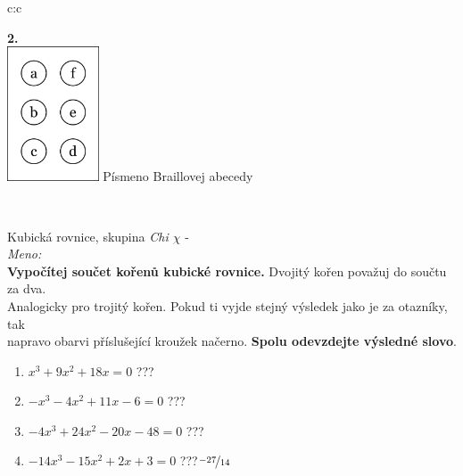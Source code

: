 \documentclass[10pt]{report}
\begin{document}
\begin{tabular}{c:c}
\begin{minipage}[c][99mm][t]{0.49\linewidth}
\begin{center}
\begin{minipage}{0.77\linewidth}
\begin{center}
\begin{varwidth}{\textwidth}
\end{varwidth}
\end{center}
\end{minipage}
\begin{minipage}{0.20\linewidth}
\begin{center}
{\Huge\bfseries 2.} \\[2mm]
\includegraphics[height=40mm]{../images/braille.png}
{\small Písmeno Braillovej abecedy}
\end{center}
\end{minipage}
\end{center}
\end{minipage}
\\ \hdashline
\begin{minipage}[c][99mm][t]{0.49\linewidth}
\begin{center}
\vspace{7mm}
{\huge Kubická rovnice, skupina \textit{Chi $\chi$} -}\\[4.5mm]
\textit{Meno:}\phantom{xxxxxxxxxxxxxxxxxxxxxxxxxxxxxxxxxxxxxxxxxxxxxxxxxxxxxxxxxxxxxxxxx}\\[3.5mm]
\textbf{Vypočítej součet kořenů kubické rovnice.} Dvojitý kořen považuj do součtu za dva.\\Analogicky pro trojitý kořen. Pokud ti vyjde stejný výsledek jako je za otazníky, tak\\napravo obarvi příslušející kroužek načerno. \textbf{Spolu odevzdejte výsledné slovo}.\\[3mm]
\begin{minipage}{0.77\linewidth}
\begin{center}
\begin{varwidth}{\textwidth}
\begin{enumerate}
\large
\item $x^3+9x^2+18x=0$\quad \dotfill\; ???\;\dotfill {}
\item $-x^3-4x^2+11x-6=0$\quad \dotfill\; ???\;\dotfill {}
\item $-4x^3+24x^2-20x-48=0$\quad \dotfill\; ???\;\dotfill {}
\item $-14x^3-15x^2+2x+3=0$\quad \dotfill\; ???\;\dotfill \quad $\nicefrac{-27}{14}$

\end{enumerate}
\end{varwidth}
\end{center}
\end{minipage}
\end{center}
\end{minipage}
\end{tabular}
\end{document}
